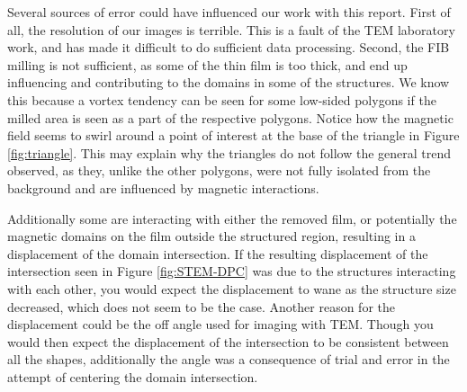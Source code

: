 
Several sources of error could have influenced our work with this report. First of all, the resolution of our images is terrible. This is a fault of the TEM laboratory work, and has made it difficult to do sufficient data processing. Second, the FIB milling is not sufficient, as some of the thin film is too thick, and end up influencing and contributing to the domains in some of the structures. We know this because a vortex tendency can be seen for some low-sided polygons if the milled area is seen as a part of the respective polygons. Notice how the magnetic field seems to swirl around a point of interest at the base of the triangle in Figure \ref{fig:triangle}. This may explain why the triangles do not follow the general trend observed, as they, unlike the other polygons, were not fully isolated from the background and are influenced by magnetic interactions.


Additionally some are interacting with either the removed film, or potentially the magnetic domains on the film outside the structured region, resulting in a displacement of the domain intersection. If the resulting displacement of the intersection seen in Figure \ref{fig:STEM-DPC} was due to the structures interacting with each other, you would expect the displacement to wane as the structure size decreased, which does not seem to be the case. Another reason for the displacement could be the off angle used for imaging with TEM. Though you would then expect the displacement of the intersection to be consistent between all the shapes, additionally the angle was a consequence of trial and error in the attempt of centering the domain intersection. 
